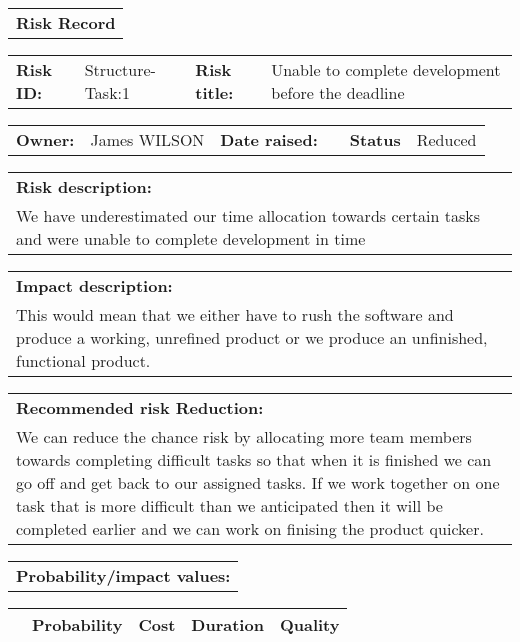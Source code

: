 \begin{table}
	\begin{tabularx}{\textwidth}{| X |}
		\hline
		\textbf{Risk Record} \\
	\end{tabularx}
	\begin{tabularx}{\textwidth}{| l | X | l | X |}
		\hline
		\textbf{Risk ID:} & Structure-Task:1 & \textbf{Risk title:} & Unable to complete development before the deadline  \\
	\end{tabularx}
	\begin{tabularx}{\textwidth}{| l | X | l | X | l | X |}
		\hline
		\textbf{Owner:} & James WILSON & \textbf{Date raised:} &  & \textbf{Status} & Reduced \\
	\end{tabularx}
	\begin{tabularx}{\textwidth}{| X |}
		\hline
		\textbf{Risk description:} \\ We have underestimated our time allocation towards certain tasks and were unable to complete development in time \\
	\end{tabularx}
	\begin{tabularx}{\textwidth}{| X |}
		\hline
		\textbf{Impact description:} \\ This would mean that we either have to rush the software and produce a working, unrefined product or we produce an unfinished, functional product. \\
	\end{tabularx}
	\begin{tabularx}{\textwidth}{| X |}
		\hline
		\textbf{Recommended risk Reduction:} \\ We can reduce the chance risk by allocating more team members towards completing difficult tasks so that when it is finished we can go off and get back to our assigned tasks. If we work together on one task that is more difficult than we anticipated then it will be completed earlier and we can work on finising the product quicker. \\
	\end{tabularx}
	\begin{tabularx}{\textwidth}{| X |}
		\hline
		\textbf{Probability/impact values:} \\
	\end{tabularx}
	\begin{tabularx}{\textwidth}{| l | l | X | X | X |}
		\hline
		 &  \textbf{Probability} & \textbf{Cost} & \textbf{Duration} & \textbf{Quality} \\ \hline

\end{tabularx}
\end{table}
